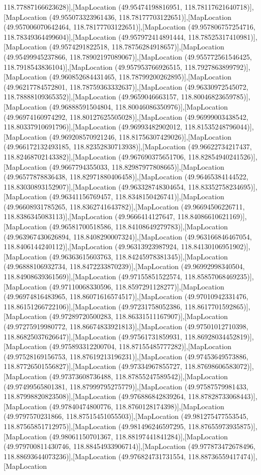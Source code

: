 118.77887166623628)],[MapLocation (49.95474198816951, 118.78117621640718)],[MapLocation (49.955073323961436, 118.78177703122651)],[MapLocation (49.957006070642464, 118.78177703122651)],[MapLocation (49.957806757254716, 118.78349364499604)],[MapLocation (49.957972414891444, 118.78525317410981)],[MapLocation (49.9574291822518, 118.78756284918657)],[MapLocation (49.95499945237866, 118.78902197089067)],[MapLocation (49.955772561546425, 118.7918543836104)],[MapLocation (49.957953766926515, 118.7927863899792)],[MapLocation (49.960852684431465, 118.78799200262895)],[MapLocation (49.96217784572801, 118.78759363332637)],[MapLocation (49.96330972545072, 118.78888109365352)],[MapLocation (49.9659046663157, 118.80046823659785)],[MapLocation (49.96888591504804, 118.80046086350976)],[MapLocation (49.96974160974292, 118.80127625505028)],[MapLocation (49.96999003438542, 118.80337910691796)],[MapLocation (49.96993482902012, 118.81535248796044)],[MapLocation (49.969208570921246, 118.81756307429026)],[MapLocation (49.966172132493185, 118.82352830713938)],[MapLocation (49.96622734217437, 118.82468702143382)],[MapLocation (49.967690375651706, 118.82854940241526)],[MapLocation (49.9667794355033, 118.82987977808665)],[MapLocation (49.96577878836438, 118.82971880406458)],[MapLocation (49.96465384144522, 118.83030893152907)],[MapLocation (49.963328748304654, 118.83352758234695)],[MapLocation (49.96341156769457, 118.8348150426741)],[MapLocation (49.96608931785265, 118.8362741643782)],[MapLocation (49.96694506226711, 118.8386345083113)],[MapLocation (49.9666414127647, 118.84086610621169)],[MapLocation (49.96581700518586, 118.84108649279783)],[MapLocation (49.963967430626894, 118.8408290007324)],[MapLocation (49.963166846467054, 118.8406144240112)],[MapLocation (49.96313923987924, 118.84130106951902)],[MapLocation (49.96363615603763, 118.84245978381345)],[MapLocation (49.96888106932734, 118.8472233870239)],[MapLocation (49.96992998340504, 118.84908639361569)],[MapLocation (49.97155851522574, 118.85857068469235)],[MapLocation (49.97110068330596, 118.8597291128277)],[MapLocation (49.96974816483965, 118.86071616574517)],[MapLocation (49.97010942331476, 118.86151266722106)],[MapLocation (49.97231758052386, 118.8617701592865)],[MapLocation (49.97289720500283, 118.86331511167907)],[MapLocation (49.97275919980772, 118.86674833921813)],[MapLocation (49.97501012710398, 118.86825037626647)],[MapLocation (49.97561731859931, 118.86928034452819)],[MapLocation (49.975893312200704, 118.87155485777282)],[MapLocation (49.97528169156753, 118.87619213196231)],[MapLocation (49.97453649573886, 118.87726501556827)],[MapLocation (49.97334967855727, 118.87698606583072)],[MapLocation (49.97373608736488, 118.87855247589542)],[MapLocation (49.97499565801381, 118.87999795275779)],[MapLocation (49.97587579981433, 118.87998820823508)],[MapLocation (49.976886842839264, 118.87828733068443)],[MapLocation (49.97840474800776, 118.8760128174398)],[MapLocation (49.9797570231866, 118.87515451055503)],[MapLocation (49.981275477553545, 118.87565851712975)],[MapLocation (49.981496246597295, 118.87655973935875)],[MapLocation (49.98061150701367, 118.88197441841284)],[MapLocation (49.979700811430746, 118.88454933906714)],[MapLocation (49.977873472678496, 118.88693644073236)],[MapLocation (49.976824731731554, 118.88736559417474)],[MapLocation 